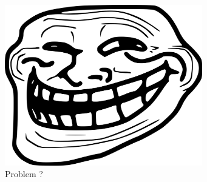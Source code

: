 \begin{figure}[tb]
	\begin{center}
		\includegraphics[height=7cm]{troll.png}
	\end{center}
	\caption{Problem ?}
	\label{fig:troll}
\end{figure}